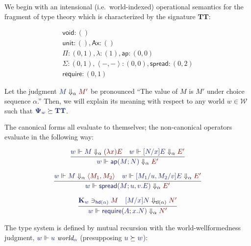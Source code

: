 \documentclass[11pt]{amsart}
\theoremstyle{definition}
\theoremstyle{remark}
\numberwithin{equation}{section}
\def\InputModeColorName{MidnightBlue}
\def\OutputModeColorName{Maroon}
\newcommand\IMode[1]{{\color{\InputModeColorName}{#1}}}
\newcommand\OMode[1]{{\color{\OutputModeColorName}{#1}}}
\newcommand\Force[2]{\IMode{#1}\Vdash #2}
\newcommand\IsWorld[2]{\IMode{#1}\ \textit{world}_\IMode{#2}}
\newcommand\Sig[1]{\mathbf{\Psi}_{#1}}
\newcommand\SigTT{\mathbf{TT}}
\newcommand\TyVoid{\mathsf{void}}
\newcommand\TyUnit{\mathsf{unit}}
\newcommand\Ax{\mathsf{Ax}}
\newcommand\SuccEq[2]{\IMode{#1}\succeq\IMode{#2}}
\newcommand\Pair[2]{\left\langle #1, #2 \right\rangle}
\newcommand\Lam[2]{(\lambda #1)#2}
\newcommand\Ap[2]{\mathsf{ap}(#1; #2)}
\newcommand\Spread[4]{\mathsf{spread}(#1; #2,#3.#4)}
\newcommand\Require[3]{\mathsf{require}(#1; #2.#3)}
\newcommand\Eval[3]{\IMode{#2}\Downarrow_{#1}\OMode{#3}}
\newcommand\Worlds{\mathcal{W}}
\newcommand\Witnesses[1]{\mathbf{K}_{#1}}
\newcommand\OpRequire{\mathsf{require}}
\begin{document}
We begin with an intensional (i.e.\ world-indexed) operational semantics for
the fragment of type theory which is characterized by the signature
$\SigTT$:

\begin{gather*}
  \TyVoid:()\\
  \TyUnit:(), \Ax:()\\
  \Pi : (0,1), \lambda : (1), \mathsf{ap} : (0,0)\\
  \Sigma : (0,1), \Pair{-}{-} : (0,0), \mathsf{spread} : (0,2)\\
  \OpRequire : (0,1)
\end{gather*}

Let the judgment $\Eval{\alpha}{M}{M'}$ be pronounced ``The value of $M$ is
$M'$ under choice sequence $\alpha$.'' Then, we will explain its meaning with
respect to any world $w\in\Worlds$ such that $\SuccEq{\Sig{w}}{\SigTT}$.

The canonical forms all evaluate to themselves; the non-canonical operators
evaluate in the following way:

\begin{gather*}
  \infer{
    \Force{w}{\Eval{\alpha}{\Ap{M}{N}}{E'}}
  }{
    \Force{w}{\Eval{\alpha}{M}{\Lam{x}{E}}} &
    \Force{w}{\Eval{\alpha}{[N/x]E}{E'}}
  }\\[6pt]
  \infer{
    \Force{w}{\Eval{\alpha}{\Spread{M}{u}{v}{E}}{E'}}
  }{
    \Force{w}{\Eval{\alpha}{M}{\Pair{M_1}{M_2}}} &
    \Force{w}{\Eval{\alpha}{[M_1/u, M_2/v]E}{E'}}
  }\\[6pt]
  \infer{
    \Force{w}{\Eval{\alpha}{\Require{A}{x}{N}}{N'}}
  }{
    \IMode{\Witnesses{w}}\ni_\IMode{\mathsf{hd}(\alpha)}\OMode{M} &
    \Eval{\mathsf{tl}(\alpha)}{[M/x]N}{N'}
  }
\end{gather*}

The type system is defined by mutual recursion with the world-wellformedness
judgment, $\Force{w}{\IsWorld{u}{\alpha}}$ (presupposing $\SuccEq{u}{w}$):
\end{document}
